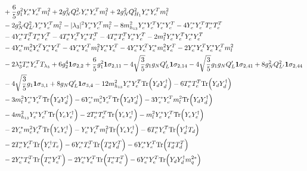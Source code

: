 {\begin{align}
 &+\frac{6}{5} g_{1}^{2} {Y_e^*  Y_{e}^{T}  m_l^2} +2 g_{N}^{2} Q_{e'}^{2} {Y_e^*  Y_{e}^{T}  m_l^2} +2 g_{N}^{2} Q_{H_1}^{2} {Y_e^*  Y_{e}^{T}  m_l^2} \nonumber \\ 
 &-2 g_{N}^{2} Q_{L'}^{2} {Y_e^*  Y_{e}^{T}  m_l^2} - |\lambda_3|^2 {Y_e^*  Y_{e}^{T}  m_l^2} -8 m_{h_{13}}^2 {Y_e^*  Y_{e}^{T}  Y_e^*  Y_{e}^{T}} -4 {Y_e^*  Y_{e}^{T}  T_e^*  T_{e}^{T}} \nonumber \\ 
 &-4 {Y_e^*  T_{e}^{T}  T_e^*  Y_{e}^{T}} -4 {T_e^*  Y_{e}^{T}  Y_e^*  T_{e}^{T}} -4 {T_e^*  T_{e}^{T}  Y_e^*  Y_{e}^{T}} -2 {m_l^2  Y_e^*  Y_{e}^{T}  Y_e^*  Y_{e}^{T}} \nonumber \\ 
 &-4 {Y_e^*  m_e^2  Y_{e}^{T}  Y_e^*  Y_{e}^{T}} -4 {Y_e^*  Y_{e}^{T}  m_l^2  Y_e^*  Y_{e}^{T}} -4 {Y_e^*  Y_{e}^{T}  Y_e^*  m_e^2  Y_{e}^{T}} -2 {Y_e^*  Y_{e}^{T}  Y_e^*  Y_{e}^{T}  m_l^2} \nonumber \\ 
 &-2 \lambda_3^* {T_e^*  Y_{e}^{T}} T_{\lambda_3} +6 g_{2}^{4} {\bf 1} \sigma_{2,2} +\frac{6}{5} g_{1}^{2} {\bf 1} \sigma_{2,11} -4 \sqrt{\frac{3}{5}} g_1 g_N Q_L' {\bf 1} \sigma_{2,14} -4 \sqrt{\frac{3}{5}} g_1 g_N Q_L' {\bf 1} \sigma_{2,41} +8 g_{N}^{2} Q_{L'}^{2} {\bf 1} \sigma_{2,44} \nonumber \\ 
 &-4 \sqrt{\frac{3}{5}} g_1 {\bf 1} \sigma_{3,1} +8 g_N Q_L' {\bf 1} \sigma_{3,4} -12 m_{h_{13}}^2 {Y_e^*  Y_{e}^{T}} \mbox{Tr}\Big({Y_d  Y_{d}^{\dagger}}\Big) -6 {T_e^*  T_{e}^{T}} \mbox{Tr}\Big({Y_d  Y_{d}^{\dagger}}\Big) \nonumber \\ 
 &-3 {m_l^2  Y_e^*  Y_{e}^{T}} \mbox{Tr}\Big({Y_d  Y_{d}^{\dagger}}\Big) -6 {Y_e^*  m_e^2  Y_{e}^{T}} \mbox{Tr}\Big({Y_d  Y_{d}^{\dagger}}\Big) -3 {Y_e^*  Y_{e}^{T}  m_l^2} \mbox{Tr}\Big({Y_d  Y_{d}^{\dagger}}\Big) \nonumber \\ 
 &-4 m_{h_{13}}^2 {Y_e^*  Y_{e}^{T}} \mbox{Tr}\Big({Y_e  Y_{e}^{\dagger}}\Big) -2 {T_e^*  T_{e}^{T}} \mbox{Tr}\Big({Y_e  Y_{e}^{\dagger}}\Big) - {m_l^2  Y_e^*  Y_{e}^{T}} \mbox{Tr}\Big({Y_e  Y_{e}^{\dagger}}\Big) \nonumber \\ 
 &-2 {Y_e^*  m_e^2  Y_{e}^{T}} \mbox{Tr}\Big({Y_e  Y_{e}^{\dagger}}\Big) - {Y_e^*  Y_{e}^{T}  m_l^2} \mbox{Tr}\Big({Y_e  Y_{e}^{\dagger}}\Big) -6 {T_e^*  Y_{e}^{T}} \mbox{Tr}\Big({Y_{d}^{\dagger}  T_d}\Big) \nonumber \\ 
 &-2 {T_e^*  Y_{e}^{T}} \mbox{Tr}\Big({Y_{e}^{\dagger}  T_e}\Big) -6 {Y_e^*  T_{e}^{T}} \mbox{Tr}\Big({T_d^*  Y_{d}^{T}}\Big) -6 {Y_e^*  Y_{e}^{T}} \mbox{Tr}\Big({T_d^*  T_{d}^{T}}\Big) \nonumber \\ 
 &-2 {Y_e^*  T_{e}^{T}} \mbox{Tr}\Big({T_e^*  Y_{e}^{T}}\Big) -2 {Y_e^*  Y_{e}^{T}} \mbox{Tr}\Big({T_e^*  T_{e}^{T}}\Big) -6 {Y_e^*  Y_{e}^{T}} \mbox{Tr}\Big({Y_d  Y_{d}^{\dagger}  m_q^{2 *}}\Big) \nonumber \\ 

\end{align}}
